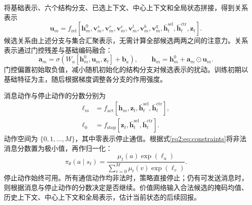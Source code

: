 将基础表示、六个结构分支、已选上下文、中心上下文和全局状态拼接，得到关系表示
\begin{equation}
\bm u_m=f_{\mathrm{rel}}\!\left[
\bm h_m^0,\bm v_m^s,\bm v_m^r,\bm v_m^c,\bm v_m^l,
\bm v_m^b,\bm v_m^q,\bar{\bm h}_t^{\mathrm{sel}},\bar{\bm h}_t^{\mathrm{ctr}},\bm z_t\right].
\label{rq2:eq:relation}
\end{equation}
候选关系由上述分支与集合汇聚表示，无需计算全部候选两两之间的注意力。关系表示通过门控残差与基础编码融合：
\begin{equation}
\bm a_m=\sigma\!\left(W_a[\bm h_m^0,\bm u_m,\bm z_t]+\bm b_a\right),\qquad
\bm h_m=\bm h_m^0+\bm a_m\odot\bm u_m.
\label{rq2:eq:gate}
\end{equation}
门控偏置初始取负值，减小随机初始化的结构分支对候选表示的扰动。训练初期以基础特征为主，随后根据梯度调整各分支的作用强度。

\begin{figure}[htbp]
\centering

\label{rq2:fig:network}
\end{figure}

消息动作与停止动作的分数分别为
\begin{equation}
\begin{aligned}
\ell_m&=f_{\mathrm{act}}[\bm h_m,\bm z_t,\bar{\bm h}_t^{\mathrm{sel}},\bar{\bm h}_t^{\mathrm{ctr}}],\\
\ell_0&=f_{\mathrm{stop}}[\bm z_t,\bar{\bm h}_t^{\mathrm{sel}},\bar{\bm h}_t^{\mathrm{ctr}}].
\end{aligned}
\label{rq2:eq:logits}
\end{equation}
动作空间为 $\{0,1,\ldots,M\}$，其中零表示停止通信。根据式\eqref{rq2:eq:constraints}将非法消息分数置为极小值，再作归一化：
\begin{equation}
\pi_\theta(a\mid s_t)=
\frac{\mu_t(a)\exp(\ell_a)}{\sum_{v=0}^M\mu_t(v)\exp(\ell_v)}.
\label{rq2:eq:policy}
\end{equation}
停止动作始终可用。所有通信动作均非法时，策略直接停止；仍有可发送消息时，则根据消息与停止动作的分数决定是否继续。价值网络输入合法候选的掩码均值、历史上下文、中心上下文和全局表示，估计当前状态的后续回报。


